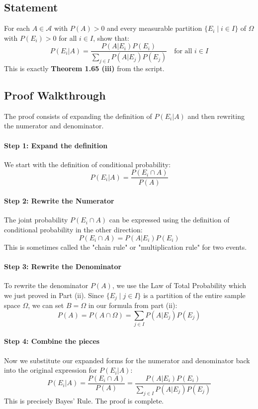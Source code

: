 \documentclass[11pt,a4paper]{article}
\begin{document}
\subsection*{Statement}
For each \(A \in \mathcal{A}\) with \(P(A) > 0\) and every measurable partition \(\{E_i \mid i \in I\}\) of \(\Omega\) with \(P(E_i) > 0\) for all \(i \in I\), show that:
\[ P(E_i | A) = \frac{P(A | E_i)P(E_i)}{\sum_{j \in I} P(A | E_j)P(E_j)} \quad \text{for all } i \in I \]
This is exactly \textbf{Theorem 1.65 (iii)} from the script.

\subsection*{Proof Walkthrough}
The proof consists of expanding the definition of \(P(E_i | A)\) and then rewriting the numerator and denominator.

\paragraph{Step 1: Expand the definition}
We start with the definition of conditional probability:
\[ P(E_i | A) = \frac{P(E_i \cap A)}{P(A)} \]

\paragraph{Step 2: Rewrite the Numerator}
The joint probability \(P(E_i \cap A)\) can be expressed using the definition of conditional probability in the other direction:
\[ P(E_i \cap A) = P(A | E_i)P(E_i) \]
This is sometimes called the "chain rule" or "multiplication rule" for two events.

\paragraph{Step 3: Rewrite the Denominator}
To rewrite the denominator \(P(A)\), we use the Law of Total Probability which we just proved in Part (ii). Since \(\{E_j \mid j \in I\}\) is a partition of the entire sample space \(\Omega\), we can set \(B = \Omega\) in our formula from part (ii):
\[ P(A) = P(A \cap \Omega) = \sum_{j \in I} P(A | E_j)P(E_j) \]

\paragraph{Step 4: Combine the pieces}
Now we substitute our expanded forms for the numerator and denominator back into the original expression for \(P(E_i | A)\):
\[ P(E_i | A) = \frac{P(E_i \cap A)}{P(A)} = \frac{P(A | E_i)P(E_i)}{\sum_{j \in I} P(A | E_j)P(E_j)} \]
This is precisely Bayes' Rule. The proof is complete.
\end{document}
